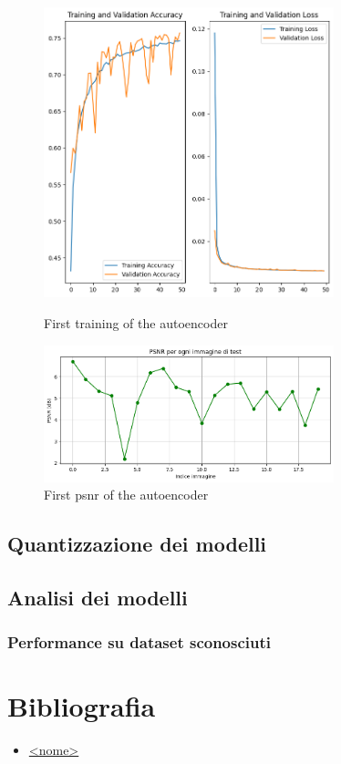 \documentclass[12pt,a4paper,openright,twoside]{book}
\newcommand{\TODOComment}[1]{}
\begin{document}
 \begin{figure}
  \centering
  \includegraphics[width=0.75\textwidth]{ridnet_train_1}
  \caption{First training of the autoencoder}
  \includegraphics[width=0.75\textwidth]{ridnet_psnr_1}
  \caption{First psnr of the autoencoder}
  \label{fig:ridnet_train_1}
\end{figure}


 
\TODOComment{Aggiungere codice del pnrr}



\section{Quantizzazione dei modelli}
\section{Analisi dei modelli}
\subsection{Performance su dataset sconosciuti}



\chapter{Bibliografia}
\begin{itemize}
    \item \href{<sito>}{<nome>}
\end{itemize}
\end{document}
